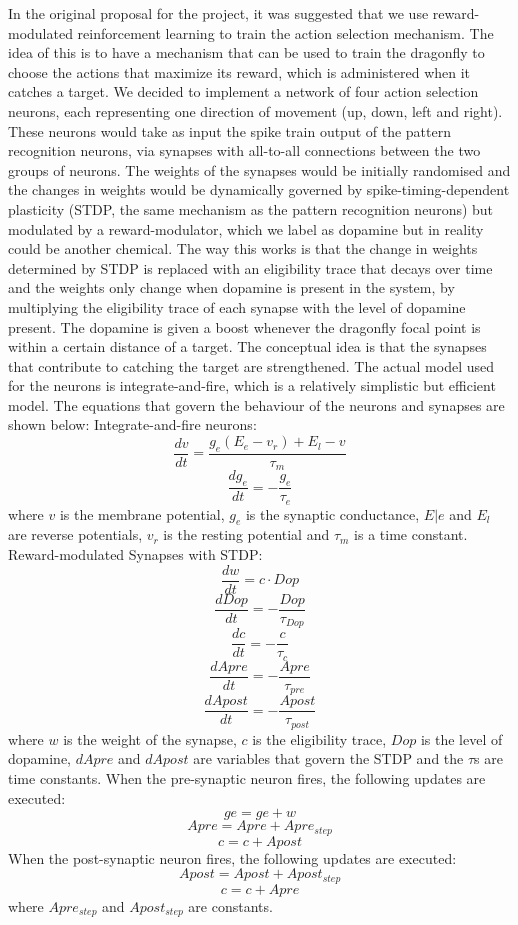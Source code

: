 \documentclass[a4paper,11pt]{article}
\begin{document}
In the original proposal for the project, it was suggested that we use reward-modulated reinforcement learning to train the action selection mechanism. The idea of this is to have a mechanism that can be used to train the dragonfly to choose the actions that maximize its reward, which is administered when it catches a target. 
\newline
\newline
We decided to implement a network of four action selection neurons, each representing one direction of movement (up, down, left and right). These neurons would take as input the spike train output of the pattern recognition neurons, via synapses with all-to-all connections between the two groups of neurons. The weights of the synapses would be initially randomised and the changes in weights would be dynamically governed by spike-timing-dependent plasticity (STDP, the same mechanism as the pattern recognition neurons) but modulated by a reward-modulator, which we label as dopamine but in reality could be another chemical. The way this works is that the change in weights determined by STDP is replaced with an eligibility trace that decays over time and the weights only change when dopamine is present in the system, by multiplying the eligibility trace of each synapse with the level of dopamine present. The dopamine is given a boost whenever the dragonfly focal point is within a certain distance of a target. The conceptual idea is that the synapses that contribute to catching the target are strengthened. The actual model used for the neurons is integrate-and-fire, which is a relatively simplistic but efficient model. The equations that govern the behaviour of the neurons and synapses are shown below: 
\newline
\newline
Integrate-and-fire neurons:
$$\frac{dv}{dt}=\frac{g _{e} (E_{e}-v _{r}) + E_{l} -v}{ \tau_{m}}$$
$$\frac{dg_{e}}{dt}= -\frac{g_{e}}{\tau_{e}}$$
where $v$ is the membrane potential, $g_{e}$ is the synaptic conductance, $E|{e}$ and $E_{l}$ are reverse potentials, $v_{r}$ is the resting potential and $\tau _{m}$ is a time constant.
\newline
Reward-modulated Synapses with STDP:
$$\frac{dw}{dt} = c \cdot Dop$$
$$\frac{dDop}{dt}=-\frac{Dop}{\tau _{Dop}}$$
$$\frac{dc}{dt} = -\frac{c}{\tau _{c}}$$
$$\frac{dApre}{dt}=-\frac{Apre}{\tau_{pre}}$$
$$\frac{dApost}{dt}=-\frac{Apost}{\tau_{post}}$$
where $w$ is the weight of the synapse, $c$ is the eligibility trace, $Dop$ is the level of dopamine, $dApre$ and $dApost$ are variables that govern the STDP and the $\tau$s are time constants.
When the pre-synaptic neuron fires, the following updates are executed:
$$ge = ge + w$$
$$Apre = Apre + Apre _{step}$$
$$c =c+Apost$$
When the post-synaptic neuron fires, the following updates are executed:
$$Apost = Apost + Apost _{step}$$
$$c =c+Apre$$
where $Apre_{step}$ and $Apost_{step}$ are constants.
\end{document}
